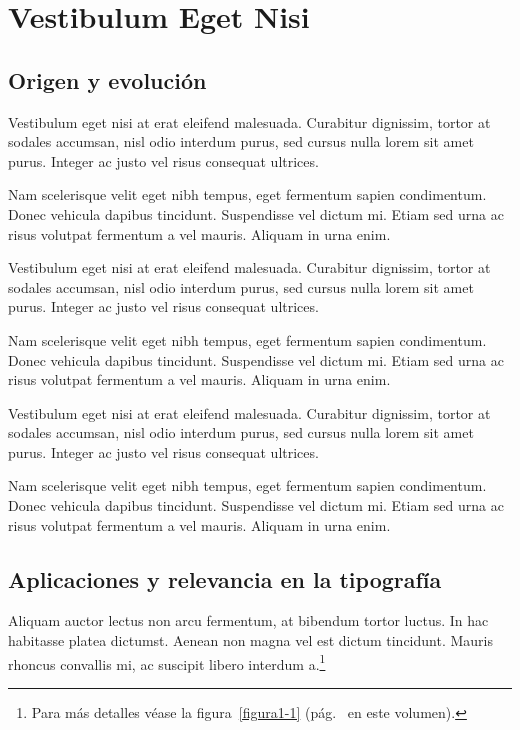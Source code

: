 \chapter{Vestibulum Eget Nisi}
\setcounter{PrimPag}{\theCurrentPage}

\section{Origen y evolución}

Vestibulum eget nisi at erat eleifend malesuada. Curabitur dignissim, tortor at sodales accumsan, nisl odio interdum purus, sed cursus nulla lorem sit amet purus. Integer ac justo vel risus consequat ultrices.

Nam scelerisque velit eget nibh tempus, eget fermentum sapien condimentum. Donec vehicula dapibus tincidunt. Suspendisse vel dictum mi. Etiam sed urna ac risus volutpat fermentum a vel mauris. Aliquam in urna enim.

Vestibulum eget nisi at erat eleifend malesuada. Curabitur dignissim, tortor at sodales accumsan, nisl odio interdum purus, sed cursus nulla lorem sit amet purus. Integer ac justo vel risus consequat ultrices.

Nam scelerisque velit eget nibh tempus, eget fermentum sapien condimentum. Donec vehicula dapibus tincidunt. Suspendisse vel dictum mi. Etiam sed urna ac risus volutpat fermentum a vel mauris. Aliquam in urna enim.

Vestibulum eget nisi at erat eleifend malesuada. Curabitur dignissim, tortor at sodales accumsan, nisl odio interdum purus, sed cursus nulla lorem sit amet purus. Integer ac justo vel risus consequat ultrices.

Nam scelerisque velit eget nibh tempus, eget fermentum sapien condimentum. Donec vehicula dapibus tincidunt. Suspendisse vel dictum mi. Etiam sed urna ac risus volutpat fermentum a vel mauris. Aliquam in urna enim.

\section{Aplicaciones y relevancia en la tipografía}

Aliquam auctor lectus non arcu fermentum, at bibendum tortor luctus. In hac habitasse platea dictumst. Aenean non magna vel est dictum tincidunt. Mauris rhoncus convallis mi, ac suscipit libero interdum a.\footnote{Para más detalles véase la figura~\ref{figura1-1} (pág.~\pageref{figura1-1} en este volumen).}

